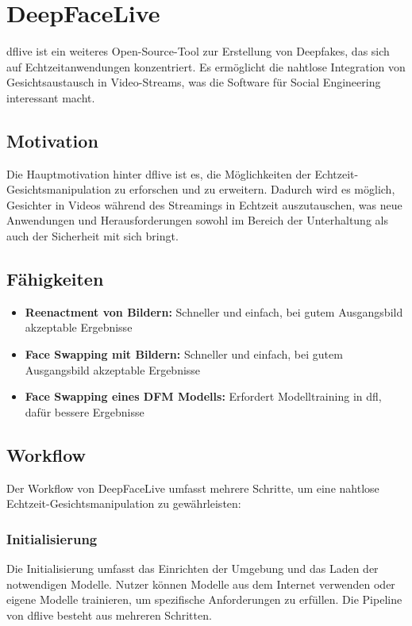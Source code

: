 \section{DeepFaceLive}\label{sec:deepfacelive}
\gls{dflive} ist ein weiteres Open-Source-Tool zur Erstellung von Deepfakes, das sich auf Echtzeitanwendungen konzentriert.
Es ermöglicht die nahtlose Integration von Gesichtsaustausch in Video-Streams, was die Software für Social Engineering interessant macht.

\subsection{Motivation}\label{subsec:motivation_dflive}
Die Hauptmotivation hinter \gls{dflive} ist es, die Möglichkeiten der Echtzeit-Gesichtsmanipulation zu erforschen und zu erweitern.
Dadurch wird es möglich, Gesichter in Videos während des Streamings in Echtzeit auszutauschen, was neue Anwendungen und Herausforderungen sowohl im Bereich der Unterhaltung als auch der Sicherheit mit sich bringt.

\subsection{Fähigkeiten}\label{subsec:fahigkeiten_dflive}
\begin{itemize}
    \item \textbf{Reenactment von Bildern:} Schneller und einfach, bei gutem Ausgangsbild akzeptable Ergebnisse
    \item \textbf{Face Swapping mit Bildern:} Schneller und einfach, bei gutem Ausgangsbild akzeptable Ergebnisse
    \item \textbf{Face Swapping eines DFM Modells:} Erfordert Modelltraining in \gls{dfl}, dafür bessere Ergebnisse
\end{itemize}

\subsection{Workflow}\label{subsec:workflow_dflive}
Der Workflow von DeepFaceLive umfasst mehrere Schritte, um eine nahtlose Echtzeit-Gesichtsmanipulation zu gewährleisten:

\subsubsection*{Initialisierung}\label{subsubsec:initialisierung_dflive}
Die Initialisierung umfasst das Einrichten der Umgebung und das Laden der notwendigen Modelle.
Nutzer können Modelle aus dem Internet verwenden oder eigene Modelle trainieren, um spezifische Anforderungen zu erfüllen.
Die Pipeline von \gls{dflive} besteht aus mehreren Schritten.\\

